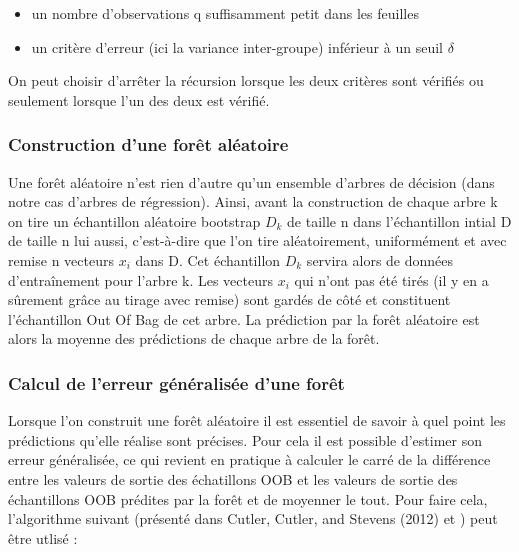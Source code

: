 \documentclass[
]{article}
\begin{document}
\begin{itemize}
\item
  un nombre d'observations q suffisamment petit dans les feuilles
\item
  un critère d'erreur (ici la variance inter-groupe) inférieur à un
  seuil \(\delta\)
\end{itemize}

On peut choisir d'arrêter la récursion lorsque les deux critères sont
vérifiés ou seulement lorsque l'un des deux est vérifié.

\hypertarget{construction-dune-foruxeat-aluxe9atoire}{%
\subsubsection{Construction d'une forêt
aléatoire}\label{construction-dune-foruxeat-aluxe9atoire}}

Une forêt aléatoire n'est rien d'autre qu'un ensemble d'arbres de
décision (dans notre cas d'arbres de régression). Ainsi, avant la
construction de chaque arbre k on tire un échantillon aléatoire
bootstrap \(D_k\) de taille n dans l'échantillon intial D de taille n
lui aussi, c'est-à-dire que l'on tire aléatoirement, uniformément et
avec remise n vecteurs \(x_i\) dans D. Cet échantillon \(D_k\) servira
alors de données d'entraînement pour l'arbre k. Les vecteurs \(x_i\) qui
n'ont pas été tirés (il y en a sûrement grâce au tirage avec remise)
sont gardés de côté et constituent l'échantillon Out Of Bag de cet
arbre. La prédiction par la forêt aléatoire est alors la moyenne des
prédictions de chaque arbre de la forêt.

\hypertarget{calcul-de-lerreur-guxe9nuxe9ralisuxe9e-dune-foruxeat}{%
\subsubsection{Calcul de l'erreur généralisée d'une
forêt}\label{calcul-de-lerreur-guxe9nuxe9ralisuxe9e-dune-foruxeat}}

Lorsque l'on construit une forêt aléatoire il est essentiel de savoir à
quel point les prédictions qu'elle réalise sont précises. Pour cela il
est possible d'estimer son erreur généralisée, ce qui revient en
pratique à calculer le carré de la différence entre les valeurs de
sortie des échatillons OOB et les valeurs de sortie des échantillons OOB
prédites par la forêt et de moyenner le tout. Pour faire cela,
l'algorithme suivant (présenté dans Cutler, Cutler, and Stevens (2012)
et ) peut être utlisé :
\end{document}
